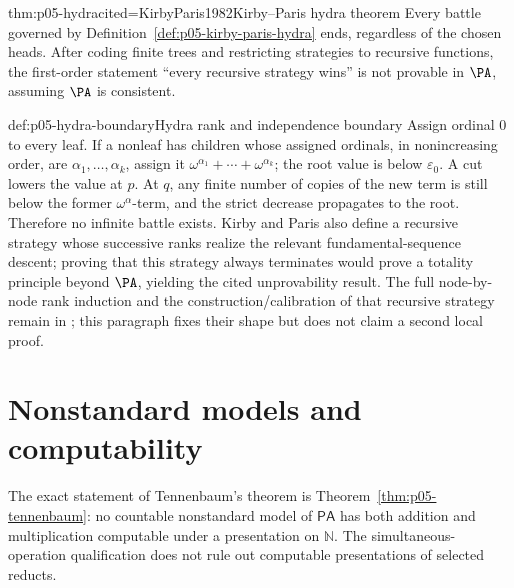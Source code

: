 \begin{hbtheorem}{thm:p05-hydra}{cited=KirbyParis1982}{Kirby--Paris hydra theorem}
Every battle governed by Definition~\ref{def:p05-kirby-paris-hydra} ends,
regardless of the chosen heads.  After coding finite trees and restricting
strategies to recursive functions, the first-order statement “every recursive
strategy wins” is not provable in \(\PA\), assuming \(\PA\) is consistent.
\end{hbtheorem}

\begin{proofboundary}{def:p05-hydra-boundary}{Hydra rank and independence boundary}
Assign ordinal \(0\) to every leaf.  If a nonleaf has children whose assigned
ordinals, in nonincreasing order, are
\(\alpha_1,\ldots,\alpha_k\), assign it
\(\omega^{\alpha_1}+\cdots+\omega^{\alpha_k}\); the root value is below
\(\varepsilon_0\).  A cut lowers the value at \(p\).  At \(q\), any finite
number of copies of the new term is still below the former
\(\omega^{\alpha}\)-term, and the strict decrease propagates to the root.
Therefore no infinite battle exists.  Kirby and Paris also define a recursive
strategy whose successive ranks realize the relevant fundamental-sequence
descent; proving that this strategy always terminates would prove a totality
principle beyond \(\PA\), yielding the cited unprovability result.  The full
node-by-node rank induction and the construction/calibration of that recursive
strategy remain in \cite{KirbyParis1982}; this paragraph fixes their shape but
does not claim a second local proof.
\end{proofboundary}

\section{Nonstandard models and computability}

The exact statement of Tennenbaum's theorem is
Theorem~\ref{thm:p05-tennenbaum}: no countable nonstandard model of
\(\mathsf{PA}\) has both addition and multiplication computable under a
presentation on \(\mathbb N\). The simultaneous-operation qualification does
not rule out computable presentations of selected reducts.

